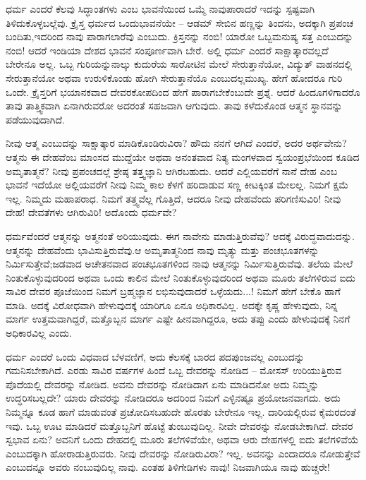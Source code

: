 ಧರ್ಮ ಎಂದರೆ ಕೆಲವು ಸಿದ್ಧಾಂತಗಳು ಎಂಬ ಭಾವನೆಯಿಂದ ಒಮ್ಮೆ ನಾವು\break ಪಾರಾದರೆ ಇದನ್ನು ಸ್ಪಷ್ಟವಾಗಿ ತಿಳಿದುಕೊಳ್ಳಬಲ್ಲೆವು. ಕ್ರೈಸ್ತ ಧರ್ಮದ ಒಂದು\break ಭಾವನೆಯೇ – ಆಡಮ್​ ಸೇಬಿನ ಹಣ್ಣನ್ನು ತಿಂದನು, ಅದಕ್ಕಾಗಿ ಪ್ರಪಂಚ ಬಂದಿತು,\break ಇದರಿಂದ ನಾವು ಪಾರಾಗಲಾರೆವು ಎಂಬುದು. ಕ್ರಿಸ್ತನನ್ನು ನಂಬಿ! ಯಾರೋ ಒಬ್ಬ\break ಮನುಷ್ಯ ಸತ್ತ ಎಂಬುದನ್ನು ನಂಬಿ! ಆದರೆ ಇಂಡಿಯಾ ದೇಶದ ಭಾವನೆ ಸಂಪೂರ್ಣವಾಗಿ ಬೇರೆ. ಅಲ್ಲಿ ಧರ್ಮ ಎಂದರೆ ಸಾಕ್ಷಾತ್ಕಾರವಲ್ಲದೆ ಬೇರೇನೂ ಅಲ್ಲ. ಒಬ್ಬ ಗುರಿಯನ್ನು\break ನಾಲ್ಕು ಕುದುರೆಯ ಸಾರೋಟಿನ ಮೇಲೆ ಸೇರುತ್ತಾನೆಯೋ, ವಿದ್ಯುತ್​ ವಾಹನದಲ್ಲಿ ಸೇರುತ್ತಾನೆಯೋ ಅಥವಾ ಉರುಳಿಕೊಂಡು ಹೋಗಿ ಸೇರುತ್ತಾನೆಯೊ ಎಂಬುದಲ್ಲ\break ಮುಖ್ಯ. ಹೇಗೆ ಹೋದರೂ ಗುರಿ ಒಂದೇ. ಕ್ರೈಸ್ತರಿಗೆ ಭಯಾನಕವಾದ ದೇವರ\break ಕೋಪದಿಂದ ಹೇಗೆ ಪಾರಾಗಬೇಕೆಂಬುದೇ ಪ್ರಶ್ನೆ. ಆದರೆ ಹಿಂದೂಗಳಿಗಾದರೊ ತಾವು ತಾತ್ತ್ವಿಕವಾಗಿ ಏನಾಗಿರುವರೋ ಅದರಂತೆ ಸಹಜವಾಗಿ ಆಗುವುದು. ತಾವು ಕಳೆದುಕೊಂಡ ಆತ್ಮನ ಸ್ಥಾನವನ್ನು ಪಡೆಯುವುದಾಗಿದೆ.

ನೀವು ಆತ್ಮ ಎಂಬುದನ್ನು ಸಾಕ್ಷಾತ್ಕಾರ ಮಾಡಿಕೊಂಡಿರುವಿರಾ? ಹೌದು ನನಗೆ ಆಗಿದೆ ಎಂದರೆ, ಅದರ ಅರ್ಥವೇನು? ಆತ್ಮನು ಈ ದೇಹವೆಂಬ ಮಾಂಸದ ಮುದ್ದೆಯೇ ಅಥವಾ ಅನಂತವಾದ ನಿತ್ಯ ಮಂಗಳವಾದ ಸ್ವಯಂಪ್ರಭೆಯಿಂದ ಕೂಡಿದ ಅಮೃತಾತ್ಮನೆ? ನೀವು ಪ್ರಪಂಚದಲ್ಲೆ ಶ್ರೇಷ್ಠ ತತ್ತ್ವಜ್ಞಾನಿ ಆಗಿರಬಹುದು. ಆದರೆ ಎಲ್ಲಿಯವರೆಗೆ ನಾನೆ ದೇಹ ಎಂಬ ಭಾವನೆ ಇದೆಯೋ ಅಲ್ಲಿಯವರೆಗೆ ನೀವು ನಿಮ್ಮ ಕಾಲ ಕೆಳಗೆ ಹರಿದಾಡುವ ಸಣ್ಣ ಕೀಟಕ್ಕಿಂತ ಮೇಲಲ್ಲ. ನಿಮಗೆ ಕ್ಷಮೆ ಇಲ್ಲ. ನಿಮ್ಮದು ಮಹಾಪರಾಧ. ನಿಮಗೆ ತತ್ತ್ವವೆಲ್ಲ ಗೊತ್ತಿದೆ, ಆದರೂ ನೀವು ದೇಹವೆಂದು ಪರಿಗಣಿಸುವಿರಿ! ನೀವು ದೇಹ! ದೇವತೆಗಳು ಆಗಿರುವಿರಿ! ಅದೊಂದು ಧರ್ಮವೇ?

ಧರ್ಮವೆಂದರೆ ಆತ್ಮನನ್ನು ಅತ್ಮನಂತೆ ಅರಿಯುವುದು. ಈಗ ನಾವೇನು ಮಾಡುತ್ತಿರುವೆವು? ಅದಕ್ಕೆ ವಿರುದ್ಧವಾದುದನ್ನು. ಆತ್ಮನನ್ನು ದೇಹವೆಂದು ಭಾವಿಸುತ್ತಿರುವೆವು.\break ಆ ಅಮೃತಾತ್ಮನಿಂದ ನಾವು ಮೃತ್ಯು ಮತ್ತು ಪಂಚಭೂತಗಳನ್ನು ನಿರ್ಮಿಸುತ್ತೇವೆ;\break ಜಡವಾದ ಅಚೇತನವಾದ ಪಂಚಭೂತಗಳಿಂದ ನಾವು ಆತ್ಮನನ್ನು ನಿರ್ಮಿಸುತ್ತಿರುವೆವು. ತಲೆಯ ಮೇಲೆ ನಿಂತುಕೊಳ್ಳುವುದರಿಂದ ಅಥವಾ ಒಂದು ಕಾಲಿನ ಮೇಲೆ ನಿಂತುಕೊಳ್ಳುವುದರಿಂದ ಅಥವಾ ಮೂರು ತಲೆಗಳಿರುವ ಐದು ಸಾವಿರ ದೇವರ ಪೂಜೆಯಿಂದ ನಿಮಗೆ ಬ್ರಹ್ಮಜ್ಞಾನ ಲಭಿಸುವುದಾದರೆ ಒಳ್ಳೆಯದು...! ನಿಮಗೆ ಹೇಗೆ ಬೇಕೊ ಹಾಗೆ ಮಾಡಿ. ಅದಕ್ಕೆ ವಿರೋಧವಾಗಿ ಹೇಳುವುದಕ್ಕೆ ಯಾರಿಗೂ ಏನೂ ಅಧಿಕಾರವಿಲ್ಲ. ಅದಕ್ಕೇ ಕೃಷ್ಣ ಹೇಳುವುದು, ನಿನ್ನ ಮಾರ್ಗ ಉತ್ತಮವಾಗಿದ್ದರೆ, ಮತ್ತೊಬ್ಬನ ಮಾರ್ಗ ಎಷ್ಟೇ ಹೀನವಾಗಿದ್ದರೂ, ಅದು ತಪ್ಪು ಎಂದು ಹೇಳುವುದಕ್ಕೆ ನಿನಗೆ ಅಧಿಕಾರವಿಲ್ಲ ಎಂದು.

ಧರ್ಮ ಎಂದರೆ ಒಂದು ವಿಧವಾದ ಬೆಳವಣಿಗೆ, ಅದು ಕೆಲಸಕ್ಕೆ ಬಾರದ ಪದಪುಂಜವಲ್ಲ ಎಂಬುದನ್ನು ಗಮನಿಸಬೇಕಾಗಿದೆ. ಎರಡು ಸಾವಿರ ವರ್ಷಗಳ ಹಿಂದೆ ಒಬ್ಬ ದೇವರನ್ನು ನೋಡಿದ – ಮೋಸಸ್​ ಉರಿಯುತ್ತಿರುವ ಪೊದೆಯಲ್ಲಿ ದೇವರನ್ನು ನೋಡಿದ. ಅವನು ದೇವರನ್ನು ನೋಡಿದಾಗ ಏನು ಮಾಡಿದನೋ ಅದು ನಿಮ್ಮನ್ನು ಉದ್ಧರಿಸಬಲ್ಲದೇ? ಯಾರು ದೇವರನ್ನು ನೋಡಿದರೂ ಅದರಿಂದ ನಿಮಗೆ ಎಳ್ಳಿನಷ್ಟೂ ಪ್ರಯೋಜನವಾಗದು. ಅದು ನಿಮ್ಮನ್ನೂ ಕೂಡ ಹಾಗೆ ಮಾಡುವಂತೆ ಪ್ರಚೋದಿಸಬಹುದೇ ಹೊರತು ಬೇರೇನೂ ಇಲ್ಲ. ದಾರಿಯಲ್ಲಿರುವ ಕೈಮರದಂತೆ ಇವು. ಒಬ್ಬ ಊಟ ಮಾಡಿದರೆ ಮತ್ತೊಬ್ಬನಿಗೆ ಹೊಟ್ಟೆ ತುಂಬುವುದಿಲ್ಲ. ನೀವೇ ದೇವರನ್ನು ನೋಡಬೇಕಾಗಿದೆ. ದೇವರ ಸ್ವಭಾವ ಏನು? ಅವನಿಗೆ ಒಂದು ದೇಹದಲ್ಲಿ ಮೂರು ತಲೆಗಳಿವೆಯೇ, ಅಥವಾ ಆರು ದೇಹಗಳಲ್ಲಿ ಐದು ತಲೆಗಳಿವೆಯೆ ಎಂಬುದಕ್ಕಾಗಿ ಹೋರಾಡುತ್ತಿರುವರು. ನೀವು ದೇವರನ್ನು ನೋಡಿರುವಿರಾ? ಇಲ್ಲ. ಅವನನ್ನು ಎಂದಾದರೂ ನೋಡುತ್ತೇವೆ ಎಂಬುದನ್ನೂ ಅವರು ನಂಬುವುದಿಲ್ಲ ನಾವು. ಎಂತಹ ತಿಳಿಗೇಡಿಗಳು ನಾವು! ನಿಜವಾಗಿಯೂ ನಾವು ಹುಚ್ಚರೇ!

